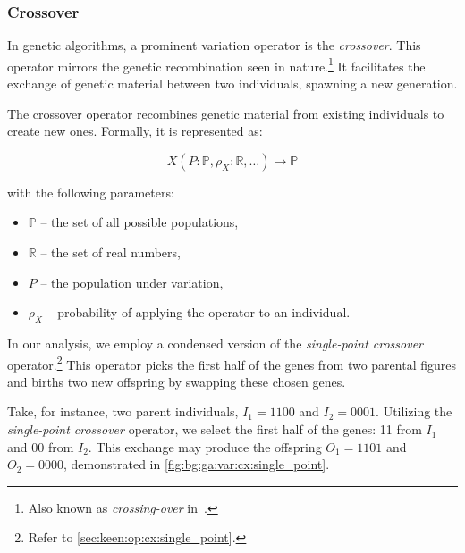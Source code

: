
\subsubsection{Crossover}
\label{sec:bg:ga:var:cx}
  In genetic algorithms, a prominent variation operator is the \emph{crossover}. This operator mirrors the genetic 
  recombination seen in nature.\footnote{
    Also known as \emph{crossing-over} in~\autocite{hollandAdaptationNaturalArtificial1992a}.
  }
  It facilitates the exchange of genetic material between two individuals, spawning a new generation.

  \begin{definition}
  \label{def:crossover_operator}
    The crossover operator recombines genetic material from existing individuals to create new ones. Formally, it is 
    represented as:

    \[
      X(P: \mathbb{P}, \rho_X: \mathbb{R}, \dots) \to \mathbb{P}
    \]

    with the following parameters:

    \begin{itemize}
      \item \(\mathbb{P}\) -- the set of all possible populations,
      \item \(\mathbb{R}\) -- the set of real numbers,
      \item \(P\) -- the population under variation,
      \item \(\rho_X\) -- probability of applying the operator to an individual.
    \end{itemize}
  \end{definition}

  In our analysis, we employ a condensed version of the \emph{single-point crossover} operator.\footnote{
    Refer to \vref{sec:keen:op:cx:single_point}.
  } This operator picks the first half of the genes from two parental figures and births two new offspring by swapping 
  these chosen genes. 

  Take, for instance, two parent individuals, \(I_1 = 1100\) and \(I_2 = 0001\). Utilizing the \textit{single-point 
  crossover} operator, we select the first half of the genes: 11 from \(I_1\) and 00 from \(I_2\). This exchange 
  may produce the offspring \(O_1 = 1101\) and \(O_2 = 0000\), demonstrated in \vref{fig:bg:ga:var:cx:single_point}.

